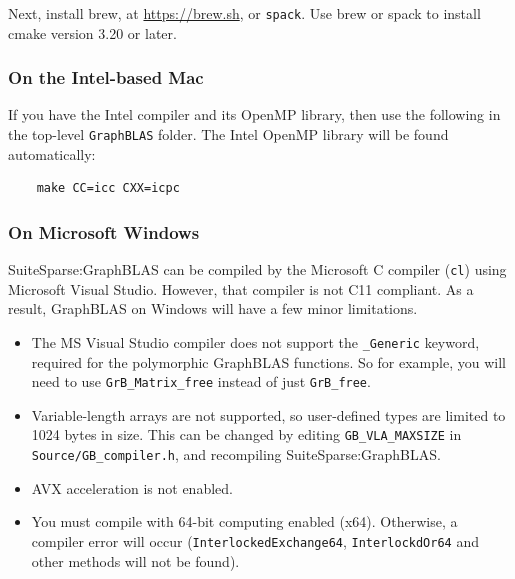 Next, install brew, at \url{https://brew.sh}, or \verb'spack'.
Use brew or spack to install cmake version 3.20 or later.

\subsubsection{On the Intel-based Mac}

If you have the Intel compiler and its OpenMP library, then use the following
in the top-level \verb'GraphBLAS' folder.  The Intel OpenMP library
will be found automatically:

    {\small
    \begin{verbatim}
    make CC=icc CXX=icpc \end{verbatim} }

\subsubsection{On Microsoft Windows}
\label{sec:windows}

SuiteSparse:GraphBLAS can be compiled by the Microsoft C compiler (\verb'cl')
using Microsoft Visual Studio.  However, that compiler is not C11 compliant. As
a result, GraphBLAS on Windows will have a few minor limitations.

\begin{itemize}
\item The MS Visual Studio compiler does not support the \verb'_Generic'
keyword, required for the polymorphic GraphBLAS functions.  So for example, you
will need to use \verb'GrB_Matrix_free' instead of just \verb'GrB_free'.

\item Variable-length arrays are not supported, so user-defined
types are limited to 1024 bytes in size.  This can be changed by editing
\verb'GB_VLA_MAXSIZE' in \verb'Source/GB_compiler.h', and recompiling
SuiteSparse:GraphBLAS.

\item AVX acceleration is not enabled.

\item You must compile with 64-bit computing enabled (x64).  Otherwise, a
compiler error will occur (\verb'InterlockedExchange64', \verb'InterlockdOr64'
and other methods will not be found).

\end{itemize}

